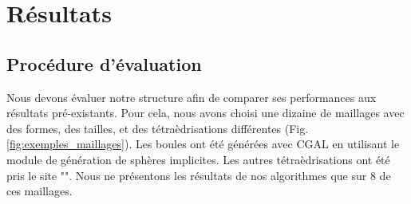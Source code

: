 \section{Résultats}
\subsection{Procédure d'évaluation}
\noindent
Nous devons évaluer notre structure afin de comparer ses performances aux résultats pré-existants. Pour cela, nous avons choisi une dizaine de maillages avec des formes, des tailles, et des tétraèdrisations différentes (Fig. \ref{fig:exemples_maillages}). Les boules ont été générées avec CGAL \cite{CGAL} en utilisant le module de génération de sphères implicites. Les autres tétraèdrisations ont été pris le site "". Nous ne présentons les résultats de nos algorithmes que sur 8 de ces maillages.

